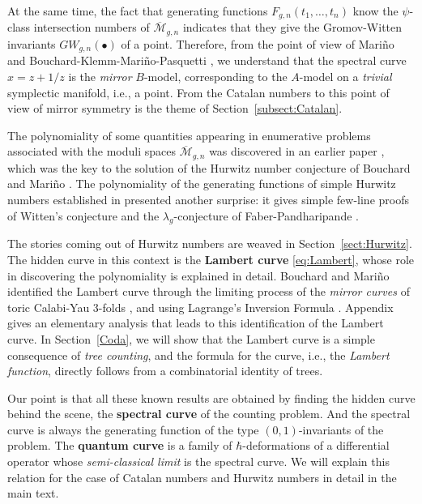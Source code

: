 \documentclass{amsart}
\theoremstyle{definition}
\numberwithin{equation}{section}
\numberwithin{figure}{section}
\newcommand{\Mbar}{{\overline{\mathcal{M}}}}
\begin{document}
At the same time, the fact that generating functions 
$F_{g,n}(t_1,\dots,t_n)$ know the $\psi$-class
intersection numbers of  $\Mbar_{g,n}$ indicates that 
they give the Gromov-Witten invariants $GW_{g,n}(\bullet)$
of a point. Therefore, from the point of view of 
Mari\~no \cite{Mar} and Bouchard-Klemm-Mari\~no-Pasquetti
\cite{BKMP}, we understand that the spectral curve $x=z+1/z$ is
the \emph{mirror} $B$-model, corresponding to the 
 $A$-model on a   \emph{trivial} symplectic manifold, i.e., a point.
From the Catalan numbers to this point of view of mirror symmetry
is the theme of Section~\ref{subsect:Catalan}.



The polynomiality of some quantities appearing in 
enumerative problems associated with the moduli spaces $\Mbar_{g,n}$
was  discovered in 
an earlier paper \cite{MZ},  which was the key to the solution
\cite{EMS} of  the 
Hurwitz number conjecture of Bouchard and Mari\~no \cite{BM}.
The polynomiality of the generating functions of 
simple Hurwitz numbers established in \cite{MZ} presented 
another surprise: it gives  simple few-line proofs of Witten's conjecture
\cite{W1991} and the $\lambda_g$-conjecture of Faber-Pandharipande
\cite{FP1, FP2}. 

The stories coming out of Hurwitz numbers 
are weaved in Section~\ref{sect:Hurwitz}.
The hidden curve in this context is the \textbf{Lambert curve} \eqref{eq:Lambert},
whose role in discovering the polynomiality is explained in detail.
Bouchard and Mari\~no \cite{BM} identified the Lambert curve through the 
limiting process of the \emph{mirror curves} of 
toric Calabi-Yau $3$-folds \cite{BKMP}, and using Lagrange's Inversion Formula \cite{WW1927}.
Appendix gives an elementary analysis that leads to this identification of 
the Lambert curve.
In Section~\ref{Coda}, we will show that the Lambert curve
is  a simple consequence of \emph{tree counting}, 
and the formula for the curve, i.e., the \emph{Lambert
function}, directly follows from a combinatorial identity
of trees. 


Our point is that all these known results are obtained by finding the
hidden curve behind the scene, the \textbf{spectral curve}
of the counting problem. 
And the spectral curve is always the generating function 
of the type $(0,1)$-invariants of the problem.
The \textbf{quantum curve} is a family of $\hbar$-deformations of 
a differential operator whose 
\emph{semi-classical limit} is the spectral curve. 
We will explain this relation for the case of  Catalan numbers 
and Hurwitz numbers in detail in the main text.
\end{document}
